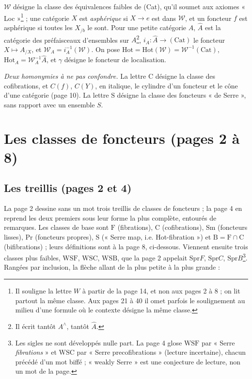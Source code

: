 \documentclass[11pt,a4paper]{article}
\begin{document}
$\mathcal{W}$ désigne la classe des équivalences faibles de (Cat), qu'il
soumet aux axiomes « Loc »\footnote{Il souligne la lettre $W$ à partir de la
page 14, et non aux pages 2 à 8 ; on lit partout la même classe. Aux pages 21
à 40 il omet parfois le soulignement au milieu d'une formule où le contexte
désigne la même classe.} ; une catégorie $X$ est \emph{asphérique} si
$X \to e$ est dans $\mathcal{W}$, et un foncteur $f$ est asphérique si toutes
les $X_{/b}$ le sont. Pour une petite catégorie $A$, $\widehat{A}$ est la
catégorie des préfaisceaux d'ensembles sur $A$\footnote{Il écrit tantôt
$A^{\wedge}$, tantôt $\widehat{A}$.}, $i_{A} : \widehat{A} \to (\mathrm{Cat})$
le foncteur $X \mapsto A_{/X}$, et $\mathcal{W}_{A} = i_{A}^{-1}(\mathcal{W})$.
On pose $\mathrm{Hot} = \mathrm{Hot}(\mathcal{W}) = \mathcal{W}^{-1}(\mathrm{Cat})$,
$\mathrm{Hot}_{A} = \mathcal{W}_{A}^{-1}\widehat{A}$, et $\gamma$ désigne le
foncteur de localisation.

\emph{Deux homonymies à ne pas confondre.} La lettre $\mathrm{C}$ désigne la
classe des cofibrations, et $C(f)$, $C(Y)$, en italique, le cylindre d'un
foncteur et le cône d'une catégorie (page 10). La lettre $\mathrm{S}$ désigne
la classe des foncteurs « de Serre », sans rapport avec un ensemble $S$.

\section*{Les classes de foncteurs (pages 2 à 8)}

\subsection*{Les treillis (pages 2 et 4)}

La page 2 dessine sans un mot trois treillis de classes de foncteurs ; la page
4 en reprend les deux premiers sous leur forme la plus complète, entourés de
remarques. Les classes de base sont
$\mathrm{F}$ (fibrations), $\mathrm{C}$ (cofibrations), $\mathrm{Sm}$ (foncteurs
lisses), $\mathrm{Pr}$ (foncteurs propres), $\mathrm{S}$ (« Serre map, i.e.
Hot-fibration ») et $\mathrm{B} = \mathrm{F} \cap \mathrm{C}$ (bifibrations) ;
leurs définitions sont à la page 8, ci-dessous. Viennent ensuite trois classes
plus faibles, $\mathrm{WSF}$, $\mathrm{WSC}$, $\mathrm{WSB}$, que la page 2
appelait $\mathrm{Spr}F$, $\mathrm{Spr}C$, $\mathrm{Spr}B$\footnote{Les sigles
ne sont développés nulle part. La page 4 glose $\mathrm{WSF}$ par « Serre
\emph{fibrations} » et $\mathrm{WSC}$ par « Serre precofibrations » (lecture
incertaine), chacun précédé d'un mot biffé ; « weakly Serre » est une
conjecture de lecture, non un mot de la page.}. Rangées par inclusion, la
flèche allant de la plus petite à la plus grande :
\end{document}
